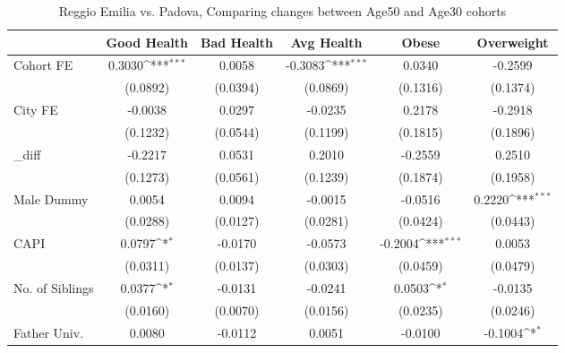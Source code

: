 \begin{table}[htbp]\centering
\def\sym#1{\ifmmode^{#1}\else\(^{#1}\)\fi}
\caption{Reggio Emilia vs. Padova, Comparing changes between Age50 and Age30 cohorts}
\begin{tabular}{l*{5}{c}}
\toprule
            &\multicolumn{1}{c}{Good Health}&\multicolumn{1}{c}{Bad Health}&\multicolumn{1}{c}{Avg Health}&\multicolumn{1}{c}{Obese}&\multicolumn{1}{c}{Overweight}\\
\midrule
Cohort FE   &      0.3030\sym{***}&      0.0058         &     -0.3083\sym{***}&      0.0340         &     -0.2599         \\
            &    (0.0892)         &    (0.0394)         &    (0.0869)         &    (0.1316)         &    (0.1374)         \\
\addlinespace
City FE     &     -0.0038         &      0.0297         &     -0.0235         &      0.2178         &     -0.2918         \\
            &    (0.1232)         &    (0.0544)         &    (0.1199)         &    (0.1815)         &    (0.1896)         \\
\addlinespace
\_diff       &     -0.2217         &      0.0531         &      0.2010         &     -0.2559         &      0.2510         \\
            &    (0.1273)         &    (0.0561)         &    (0.1239)         &    (0.1874)         &    (0.1958)         \\
\addlinespace
Male Dummy  &      0.0054         &      0.0094         &     -0.0015         &     -0.0516         &      0.2220\sym{***}\\
            &    (0.0288)         &    (0.0127)         &    (0.0281)         &    (0.0424)         &    (0.0443)         \\
\addlinespace
CAPI        &      0.0797\sym{*}  &     -0.0170         &     -0.0573         &     -0.2004\sym{***}&      0.0053         \\
            &    (0.0311)         &    (0.0137)         &    (0.0303)         &    (0.0459)         &    (0.0479)         \\
\addlinespace
No. of Siblings&      0.0377\sym{*}  &     -0.0131         &     -0.0241         &      0.0503\sym{*}  &     -0.0135         \\
            &    (0.0160)         &    (0.0070)         &    (0.0156)         &    (0.0235)         &    (0.0246)         \\
\addlinespace
Father Univ.&      0.0080         &     -0.0112         &      0.0051         &     -0.0100         &     -0.1004\sym{*}  \\

\end{tabular}
\end{table}

